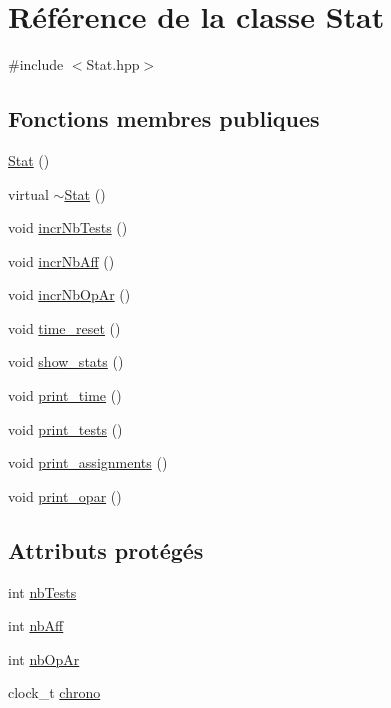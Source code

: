 \hypertarget{class_stat}{\section{Référence de la classe Stat}
\label{class_stat}
}


{\ttfamily \#include $<$Stat.\-hpp$>$}

\subsection*{Fonctions membres publiques}
\begin{DoxyCompactItemize}
\item 
\hyperlink{class_stat_ae928e5dc2e02aa907902d4f3b369ab4a}{Stat} ()
\item 
virtual \hyperlink{class_stat_a160eb53b49050e1e0ccbc9b907618f0a}{$\sim$\-Stat} ()
\item 
void \hyperlink{class_stat_adde36e2e32b49973dd5305fe11fb5b1c}{incr\-Nb\-Tests} ()
\item 
void \hyperlink{class_stat_ae6f901344ac36750f4146ee093823122}{incr\-Nb\-Aff} ()
\item 
void \hyperlink{class_stat_a25ec11af23e836818eb78ef1715b4c5c}{incr\-Nb\-Op\-Ar} ()
\item 
void \hyperlink{class_stat_a6b4e1dc31e5d14d639a1d73b95c372f7}{time\-\_\-reset} ()
\item 
void \hyperlink{class_stat_aadb6e5b25d33840ea7c72e4badc53087}{show\-\_\-stats} ()
\item 
void \hyperlink{class_stat_a936652faec132143ebfd49dd324a049f}{print\-\_\-time} ()
\item 
void \hyperlink{class_stat_a406cc02790b5aa1e20c3c9bb29f25623}{print\-\_\-tests} ()
\item 
void \hyperlink{class_stat_a0c7005a7219c0ffa6e9bda7041eaa363}{print\-\_\-assignments} ()
\item 
void \hyperlink{class_stat_aad4baf34d7c7f18087eac414a349a2af}{print\-\_\-opar} ()
\end{DoxyCompactItemize}
\subsection*{Attributs protégés}
\begin{DoxyCompactItemize}
\item 
int \hyperlink{class_stat_a6f53f0a3c4000e2bd0d1d6b5d343781e}{nb\-Tests}
\item 
int \hyperlink{class_stat_a53bde9523b4dce5f474d05daeb9cdde7}{nb\-Aff}
\item 
int \hyperlink{class_stat_a619b6bf5dde16db7838ca1e00852f155}{nb\-Op\-Ar}
\item 
clock\-\_\-t \hyperlink{class_stat_a1ad6ee4f3626f9ba6fdb847244403939}{chrono}
\end{DoxyCompactItemize}


